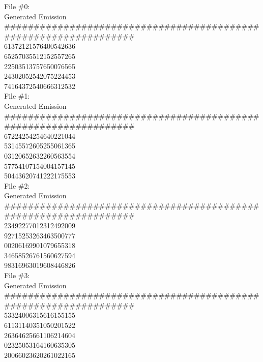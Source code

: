 \begin{solution}
File \#0:\\
Generated Emission            \\
{\footnotesize \#\#\#\#\#\#\#\#\#\#\#\#\#\#\#\#\#\#\#\#\#\#\#\#\#\#\#\#\#\#\#\#\#\#\#\#\#\#\#\#\#\#\#\#\#\#\#\#\#\#\#\#\#\#\#\#\#\#\#\#\#\#\#\#\#}\\
61372121576400542636    \\      
65257035512152557265    \\      
22503513757650076565    \\      
24302052542075224453    \\      
74164372540666312532    \\      

File \#1:\\
Generated Emission  \\          
{\footnotesize \#\#\#\#\#\#\#\#\#\#\#\#\#\#\#\#\#\#\#\#\#\#\#\#\#\#\#\#\#\#\#\#\#\#\#\#\#\#\#\#\#\#\#\#\#\#\#\#\#\#\#\#\#\#\#\#\#\#\#\#\#\#\#\#\#}\\
67224254254640221044    \\      
53145572605255061365   \\       
03120652632260563554   \\       
57754107154004157145   \\       
50443620741222175553   \\       

File \#2:\\
Generated Emission      \\      
{\footnotesize \#\#\#\#\#\#\#\#\#\#\#\#\#\#\#\#\#\#\#\#\#\#\#\#\#\#\#\#\#\#\#\#\#\#\#\#\#\#\#\#\#\#\#\#\#\#\#\#\#\#\#\#\#\#\#\#\#\#\#\#\#\#\#\#\#}\\
23492277012312492009     \\     
92715253263463500777     \\     
00206169901079655318     \\     
34658526761560627594     \\     
98316963019608446826     \\     

File \#3:\\
Generated Emission      \\      
{\footnotesize \#\#\#\#\#\#\#\#\#\#\#\#\#\#\#\#\#\#\#\#\#\#\#\#\#\#\#\#\#\#\#\#\#\#\#\#\#\#\#\#\#\#\#\#\#\#\#\#\#\#\#\#\#\#\#\#\#\#\#\#\#\#\#\#\#}\\
53324006315616155155    \\      
61131140351050201522    \\      
26364625661106214604    \\      
02325053164160635305    \\      
20066023620261022165    \\      


\end{solution}
